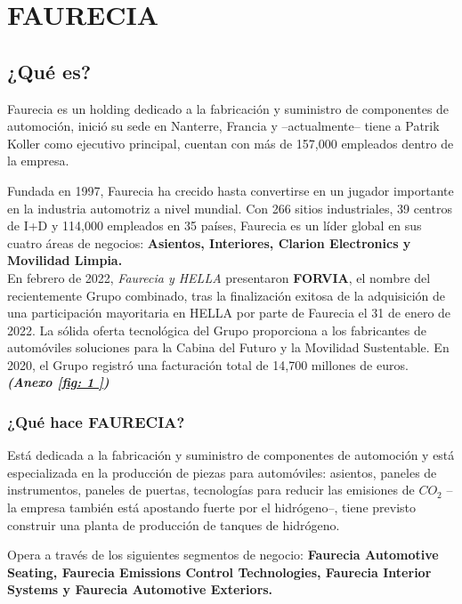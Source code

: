 \documentclass[letterpaper,12pt]{article}
\begin{document}
\begin{sloppypar}
\newpage
\section{\textcolor[rgb]{0.4,0.4,0.9}{FAURECIA}}
\subsection{\textcolor[rgb]{0.9,0.3,0.3}{¿Qué es?}}
Faurecia es un holding dedicado a la fabricación y suministro de componentes de automoción, inició su sede en Nanterre, Francia y --actualmente-- tiene a Patrik Koller como ejecutivo principal, cuentan con más de 157,000 empleados dentro de la empresa. 

Fundada en 1997, Faurecia ha crecido hasta convertirse en un jugador importante en la industria automotriz a nivel mundial. Con 266 sitios industriales, 39 centros de I+D y 114,000 empleados en 35 países, Faurecia es un líder global en sus cuatro áreas de negocios: \textbf{Asientos, Interiores, Clarion Electronics y Movilidad Limpia.} 
\vspace{0.3cm}\\ 
En febrero de 2022, \textit{Faurecia y HELLA} presentaron \textbf{FORVIA}, el nombre del recientemente Grupo combinado, tras la finalización exitosa de la adquisición de una participación mayoritaria en HELLA por parte de Faurecia el 31 de enero de 2022. La sólida oferta tecnológica del Grupo proporciona a los fabricantes de automóviles soluciones para la Cabina del Futuro y la Movilidad Sustentable. En 2020, el Grupo registró una facturación total de 14,700 millones de euros. \textbf{\textit{(Anexo \ref{fig: 1 })}}

\subsubsection{¿Qué hace FAURECIA?}
Está dedicada a la fabricación y suministro de componentes de automoción y está especializada en la producción de piezas para automóviles: asientos, paneles de instrumentos, paneles de puertas, tecnologías para reducir las emisiones de $CO_2$ --la empresa también está apostando fuerte por el hidrógeno--, tiene previsto construir una planta de producción de tanques de hidrógeno.

Opera a través de los siguientes segmentos de negocio: \textbf{Faurecia Automotive Seating, Faurecia Emissions Control Technologies, Faurecia Interior Systems y Faurecia Automotive Exteriors.}


\end{sloppypar}
\end{document}
